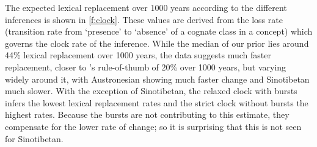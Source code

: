 \documentclass[a4paper,12pt]{scrartcl}
\begin{document}
The expected lexical replacement over 1000 years according to the different
inferences is shown in \cref{f:clock}. These values are derived from the loss
rate (transition rate from ‘presence’ to ‘absence’ of a cognate class in a
concept) which governs the clock rate of the inference. While the median of our
prior lies around 44\% lexical replacement over 1000 years, the data suggests
much faster replacement, closer to \parencite{swadesh1955greater}'s
rule-of-thumb of 20\% over 1000 years, but varying widely around it, with
Austronesian showing much faster change and Sinotibetan much slower. With the
exception of Sinotibetan, the relaxed clock with bursts infers the lowest
lexical replacement rates and the strict clock without bursts the highest rates.
Because the bursts are not contributing to this estimate, they compensate for
the lower rate of change; so it is surprising that this is not seen for
Sinotibetan.
\end{document}
